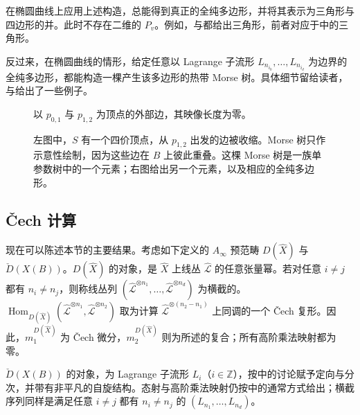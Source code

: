 \begin{example}\label{ex:8.23}
在椭圆曲线上应用上述构造，总能得到真正的全纯多边形，并将其表示为三角形与四边形的并。此时不存在二维的 $P_v$。例如，与都给出三角形，前者对应于中的三角形。

反过来，在椭圆曲线的情形，给定任意以 Lagrange 子流形 $L_{n_{i_0}},\ldots,L_{n_{i_d}}$ 为边界的全纯多边形，都能构造一棵产生该多边形的热带 Morse 树。具体细节留给读者，与给出了一些例子。
\begin{figure}[H]
\centering
{}
\caption{以 $p_{0,1}$ 与 $p_{1,2}$ 为顶点的外部边，其映像长度为零。}\label{fig:8.34}
\end{figure}
\begin{figure}[H]
\centering
{}
\caption{左图中，$S$ 有一个四价顶点，从 $p_{1,2}$ 出发的边被收缩。Morse 树只作示意性绘制，因为这些边在 $B$ 上彼此重叠。这棵 Morse 树是一族单参数树中的一个元素；右图给出另一个元素，以及相应的全纯多边形。}\label{fig:8.35}
\end{figure}
\end{example}

\subsection{\v{C}ech 计算}\label{sec:8.4.5}

现在可以陈述本节的主要结果。考虑如下定义的 $A_\infty$ 预范畴 $D(\widehat X)$ 与 $\check D(X(B))$。$D(\widehat X)$ 的对象，是 $\widehat X$ 上线丛 $\widehat{\mathcal L}$ 的任意张量幂。若对任意 $i\ne j$ 都有 $n_i\ne n_j$，则称线丛列 $(\widehat{\mathcal L}^{\otimes n_1},\ldots,\widehat{\mathcal L}^{\otimes n_d})$ 为横截的。$\operatorname{Hom}_{D(\widehat X)}(\widehat{\mathcal L}^{\otimes n_1},\widehat{\mathcal L}^{\otimes n_2})$ 取为计算 $\widehat{\mathcal L}^{\otimes(n_2-n_1)}$ 上同调的一个 \v{C}ech 复形。因此，$m_1^{D(\widehat X)}$ 为 \v{C}ech 微分，$m_2^{D(\widehat X)}$ 则为所述的复合；所有高阶乘法映射都为零。

$\check D(X(B))$ 的对象，为 Lagrange 子流形 $L_i$（$i\in\mathbb Z$），按中的讨论赋予定向与分次，并带有非平凡的自旋结构。态射与高阶乘法映射仍按中的通常方式给出；横截序列同样是满足任意 $i\ne j$ 都有 $n_i\ne n_j$ 的 $(L_{n_1},\ldots,L_{n_d})$。

